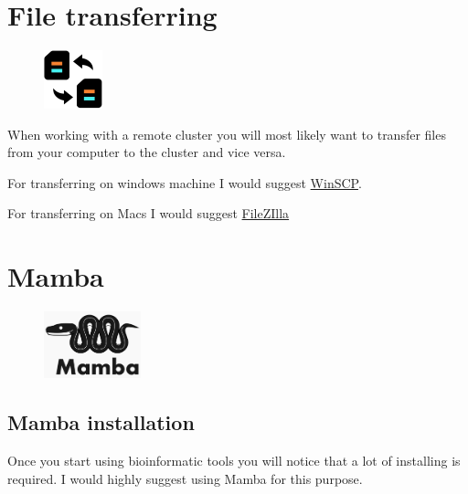 \documentclass[
  letterpaper,
  DIV=11,
  numbers=noendperiod]{scrreprt}
\begin{document}
\hypertarget{file-transferring}{%
\chapter{File transferring}\label{file-transferring}}

\begin{figure}

{\centering \includegraphics[width=0.15\textwidth,height=\textheight]{figures/file_transfer.png}

}

\end{figure}

When working with a remote cluster you will most likely want to transfer
files from your computer to the cluster and vice versa.

For transferring on windows machine I would suggest
\href{https://winscp.net/eng/index.php}{WinSCP}.

For transferring on Macs I would suggest
\href{https://filezilla-project.org/}{FileZIlla}

\hypertarget{mamba}{%
\chapter{Mamba}\label{mamba}}

\begin{figure}

{\centering \includegraphics[width=0.25\textwidth,height=\textheight]{figures/mamba_logo.png}

}

\end{figure}

\hypertarget{mamba_install}{%
\section{Mamba installation}\label{mamba_install}}

Once you start using bioinformatic tools you will notice that a lot of
installing is required. I would highly suggest using Mamba for this
purpose.
\end{document}
